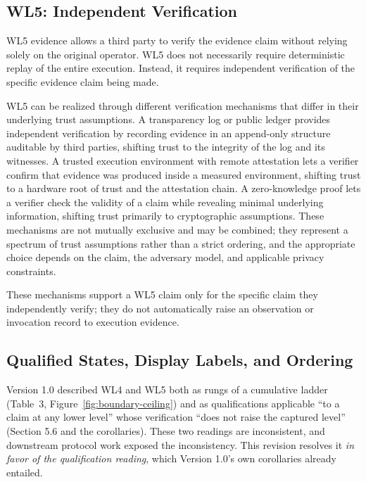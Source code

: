 \documentclass[11pt]{article}
\begin{document}
\subsection{WL5: Independent Verification}
WL5 evidence allows a third party to verify the evidence claim without relying solely on the original operator. WL5 does not necessarily require deterministic replay of the entire execution. Instead, it requires independent verification of the specific evidence claim being made.

WL5 can be realized through different verification mechanisms that differ in their underlying trust assumptions. A transparency log or public ledger provides independent verification by recording evidence in an append-only structure auditable by third parties, shifting trust to the integrity of the log and its witnesses. A trusted execution environment with remote attestation lets a verifier confirm that evidence was produced inside a measured environment, shifting trust to a hardware root of trust and the attestation chain. A zero-knowledge proof lets a verifier check the validity of a claim while revealing minimal underlying information, shifting trust primarily to cryptographic assumptions. These mechanisms are not mutually exclusive and may be combined; they represent a spectrum of trust assumptions rather than a strict ordering, and the appropriate choice depends on the claim, the adversary model, and applicable privacy constraints.

These mechanisms support a WL5 claim only for the specific claim they independently verify; they do not automatically raise an observation or invocation record to execution evidence.

\subsection{Qualified States, Display Labels, and Ordering}
\label{sec:qualified-states}

Version 1.0 described WL4 and WL5 both as rungs of a cumulative ladder (Table~3, Figure~\ref{fig:boundary-ceiling}) and as qualifications applicable ``to a claim at any lower level'' whose verification ``does not raise the captured level'' (Section 5.6 and the corollaries). These two readings are inconsistent, and downstream protocol work exposed the inconsistency. This revision resolves it \emph{in favor of the qualification reading}, which Version 1.0's own corollaries already entailed.
\end{document}
